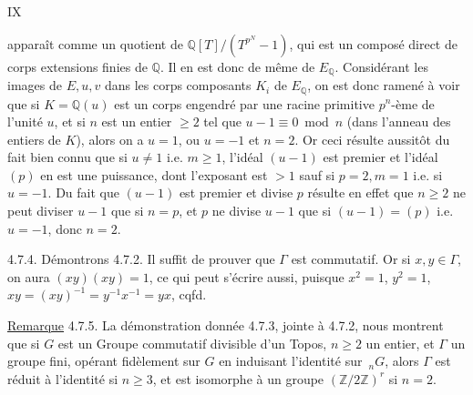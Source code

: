 \hfill IX

\margin{$\begin{gathered}\cdot\\\cdot\end{gathered}$}apparaît comme un quotient de $\mathbb Q[T]/(T^{p^N}-1)$, qui est un composé direct
de corps extensions finies de $\mathbb Q$. Il en est donc de même de $E_{\mathbb Q}$. Considérant
les images de $E,u,v$ dans les corps composants $K_i$ de $E_{\mathbb Q}$, on est donc
ramené à voir que si $K=\mathbb Q(u)$ est un corps engendré par une racine
primitive $p^n$-ème de l'unité $u$, et si $n$ est un entier $\geq2$ tel que $u-1\equiv0\bmod n$ (dans l'anneau des entiers de $K$), alors on a $u=1$, ou $u=-1$ et $n=2$.
Or ceci résulte aussitôt du fait bien connu que si $u\ne1$ i.e. $m\geq1$, l'idéal $(u-1)$ est premier et l'idéal $(p)$ en est une puissance, dont l'exposant est $>1$ sauf si $p=2,m=1$ i.e. si $u=-1$.
Du fait que $(u-1)$ est premier et divise $p$ résulte en effet que $n\geq2$ ne peut diviser $u-1$ que si $n=p$, et $p$ ne divise $u-1$ que si $(u-1)=(p)$ i.e. $u=-1$, donc $n=2$.

4.7.4. Démontrons 4.7.2. Il suffit de prouver que $\Gamma$ est commutatif.
Or si $x,y\in\Gamma$, on aura $(xy)(xy)=1$, ce qui peut s'écrire aussi, puisque $x^2=1$, $y^2=1$, $xy=(xy)^{-1}=y^{-1}x^{-1}=yx$, cqfd.

\uline{Remarque} 4.7.5. La démonstration donnée 4.7.3, jointe à 4.7.2, nous
montrent que si $G$ est un Groupe commutatif divisible d'un Topos, $n\geq2$ un entier, et $\Gamma$ un groupe fini, opérant fidèlement sur $G$ en induisant
l'identité sur $\,{}_nG$, alors $\Gamma$ est réduit à l'identité si $n\geq3$, et est isomorphe à un groupe $(\mathbb Z/2\mathbb Z)^r$ si $n=2$.
